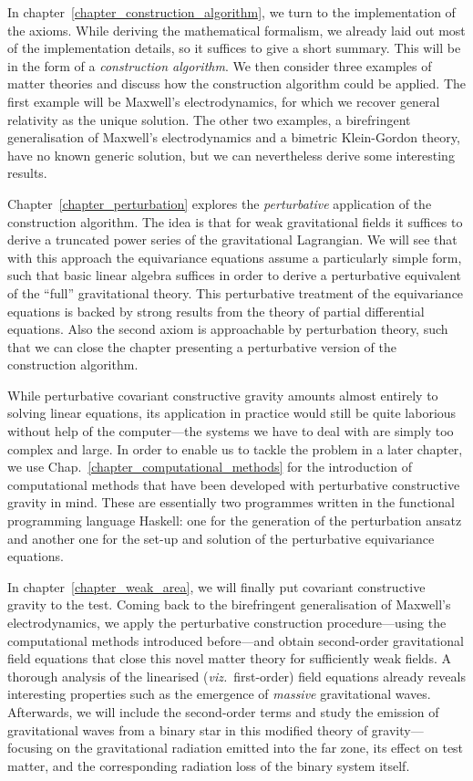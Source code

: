 In chapter~\ref{chapter_construction_algorithm}, we turn to the implementation of the axioms. While deriving the mathematical formalism, we already laid out most of the implementation details, so it suffices to give a short summary. This will be in the form of a \emph{construction algorithm}. We then consider three examples of matter theories and discuss how the construction algorithm could be applied. The first example will be Maxwell's electrodynamics, for which we recover general relativity as the unique solution. The other two examples, a birefringent generalisation of Maxwell's electrodynamics and a bimetric Klein-Gordon theory, have no known generic solution, but we can nevertheless derive some interesting results.

Chapter~\ref{chapter_perturbation} explores the \emph{perturbative} application of the construction algorithm. The idea is that for weak gravitational fields it suffices to derive a truncated power series of the gravitational Lagrangian. We will see that with this approach the equivariance equations assume a particularly simple form, such that basic linear algebra suffices in order to derive a perturbative equivalent of the ``full'' gravitational theory. This perturbative treatment of the equivariance equations is backed by strong results from the theory of partial differential equations. Also the second axiom is approachable by perturbation theory, such that we can close the chapter presenting a perturbative version of the construction algorithm.

While perturbative covariant constructive gravity amounts almost entirely to solving linear equations, its application in practice would still be quite laborious without help of the computer---the systems we have to deal with are simply too complex and large. In order to enable us to tackle the problem in a later chapter, we use Chap.~\ref{chapter_computational_methods} for the introduction of computational methods that have been developed with perturbative constructive gravity in mind. These are essentially two programmes written in the functional programming language Haskell: one for the generation of the perturbation ansatz and another one for the set-up and solution of the perturbative equivariance equations.

In chapter~\ref{chapter_weak_area}, we will finally put covariant constructive gravity to the test. Coming back to the birefringent generalisation of Maxwell's electrodynamics, we apply the perturbative construction procedure---using the computational methods introduced before---and obtain second-order gravitational field equations that close this novel matter theory for sufficiently weak fields. A thorough analysis of the linearised (\emph{viz.}\ first-order) field equations already reveals interesting properties such as the emergence of \emph{massive} gravitational waves. Afterwards, we will include the second-order terms and study the emission of gravitational waves from a binary star in this modified theory of gravity---focusing on the gravitational radiation emitted into the far zone, its effect on test matter, and the corresponding radiation loss of the binary system itself.

